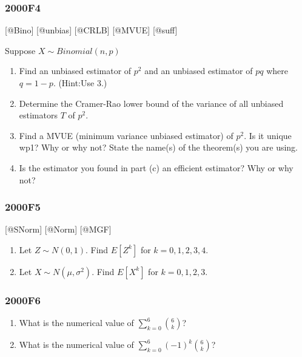 \documentclass[6pt,Portrait]{article}
\begin{document}
\hypertarget{f4}{%
\subsubsection{2000F4}\label{f4}}

{[}@Bino{]} {[}@unbias{]} {[}@CRLB{]} {[}@MVUE{]} {[}@suff{]}

Suppose \(X\sim Binomial(n,p)\)

\begin{enumerate}
\def\labelenumi{\Alph{enumi})}
\item
  Find an unbiased estimator of \(p^2\) and an unbiased estimator of
  \(pq\) where \(q=1-p\). (Hint:Use 3.)
\item
  Determine the Cramer-Rao lower bound of the variance of all unbiased
  estimators \(T\) of \(p^2\).
\item
  Find a MVUE (minimum variance unbiased estimator) of \(p^2\). Is it
  unique wp1? Why or why not? State the name(s) of the theorem(s) you
  are using.
\item
  Is the estimator you found in part (c) an efficient estimator? Why or
  why not?
\end{enumerate}

\hypertarget{f5}{%
\subsubsection{2000F5}\label{f5}}

{[}@SNorm{]} {[}@Norm{]} {[}@MGF{]}

\begin{enumerate}
\def\labelenumi{\Alph{enumi})}
\item
  Let \(Z\sim N(0, 1)\). Find \(E[Z^k]\) for \(k=0,1,2,3,4\).
\item
  Let \(X\sim N(\mu,\sigma^2)\). Find \(E[X^k]\) for \(k=0,1,2,3\).
\end{enumerate}

\hypertarget{f6}{%
\subsubsection{2000F6}\label{f6}}

\begin{enumerate}
\def\labelenumi{\Alph{enumi})}
\item
  What is the numerical value of \(\sum_{k=0}^6\binom{6}{k}\)?
\item
  What is the numerical value of \(\sum_{k=0}^6(-1)^k\binom{6}{k}\)?
\end{enumerate}
\end{document}
